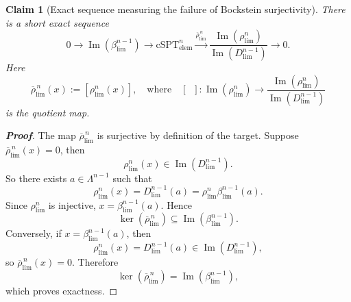 \documentclass[aps,prx,reprint,superscriptaddress,twocolumn,amsmath,amssymb,amsfonts, nofootinbib]{revtex4-2}
\theoremstyle{apsstyle}
\newtheorem{claim}{Claim}
\begin{document}
\bigskip 

\begin{claim}[Exact sequence measuring the failure of Bockstein surjectivity] \label{claim:bockstein_failure_sequence} There is a short exact sequence 
\begin{equation} 
\label{eq:ses_Bockstein_failure}
0 \longrightarrow \operatorname{Im}(\beta_{\lim}^{n-1}) \longrightarrow \mathrm{cSPT}_{\mathrm{elem}}^n \xrightarrow{\overline{\rho}_{\lim}^{\,n}} \dfrac{\operatorname{Im}(\rho_{\lim}^n)} {\operatorname{Im}(D_{\lim}^{n-1})} \longrightarrow 0 . 
\end{equation} 
Here 
\begin{equation} 
\overline{\rho}_{\lim}^{\,n}(x) := [\rho_{\lim}^n(x)],\quad \text{where}\quad [\;\;]: \operatorname{Im}(\rho_{\lim}^n) \xrightarrow{} \dfrac{\operatorname{Im}(\rho_{\lim}^n)} {\operatorname{Im}(D_{\lim}^{n-1})}
\end{equation} 
is the quotient map.
\end{claim}

\begin{proof}[\textnormal{\textbf{Proof}}]
The map $\overline{\rho}_{\lim}^{\,n}$ is surjective by definition of the target. Suppose $\overline{\rho}_{\lim}^{\,n}(x)=0 $, then 
\begin{equation*}
\rho_{\lim}^n(x)\in\operatorname{Im}(D_{\lim}^{n-1}).
\end{equation*}
So there exists $a\in\Lambda^{n-1}$ such that 
\begin{equation} 
\rho_{\lim}^n(x) = D_{\lim}^{n-1}(a) = \rho_{\lim}^n\beta_{\lim}^{n-1}(a). 
\end{equation} 
Since $\rho_{\lim}^n$ is injective, $x=\beta_{\lim}^{n-1}(a).$ 
Hence 
\begin{equation*}
\ker(\overline{\rho}_{\lim}^{\,n}) \subseteq \operatorname{Im}(\beta_{\lim}^{n-1}). 
\end{equation*}
Conversely, if $x=\beta_{\lim}^{n-1}(a)$, then 
\begin{equation} 
\rho_{\lim}^n(x) = D_{\lim}^{n-1}(a) \in \operatorname{Im}(D_{\lim}^{n-1}), 
\end{equation} 
so $\overline{\rho}_{\lim}^{\,n}(x)=0 $. Therefore 
\begin{equation} 
\ker(\overline{\rho}_{\lim}^{\,n}) = \operatorname{Im}(\beta_{\lim}^{n-1}), 
\end{equation} 
which proves exactness. 
\end{proof}

\bigskip 
\end{document}
